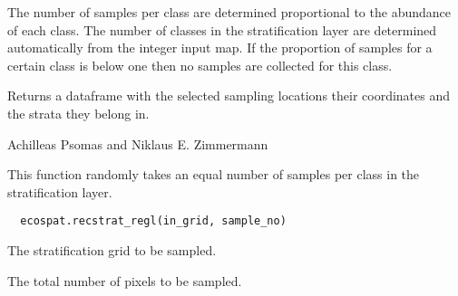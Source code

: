 \documentclass[a4paper]{book}
\begin{document}
%
\begin{Details}\relax
The number of samples per class are determined proportional to the abundance of each class.
The number of classes in the stratification layer are determined automatically from the integer input map.
If the proportion of samples for a certain class is below one then no samples are collected for this class.
\end{Details}
%
\begin{Value}
Returns a dataframe with the selected sampling locations their coordinates and the strata they belong in.
\end{Value}
%
\begin{Author}\relax
Achilleas Psomas  and Niklaus E. Zimmermann 
\end{Author}
%
\begin{SeeAlso}\relax
{}
\end{SeeAlso}
%
\begin{Examples}
\end{Examples}
%
\begin{Description}\relax
This function randomly takes an equal number of samples per class in the stratification layer. 
\end{Description}
%
\begin{Usage}
\begin{verbatim}
  ecospat.recstrat_regl(in_grid, sample_no)
\end{verbatim}
\end{Usage}
%
\begin{Arguments}
\begin{ldescription}
\item[\code{in\_grid}] 
The stratification grid to be sampled.

\item[\code{sample\_no}] 
The total number of pixels to be sampled.

\end{ldescription}
\end{Arguments}
\end{document}
